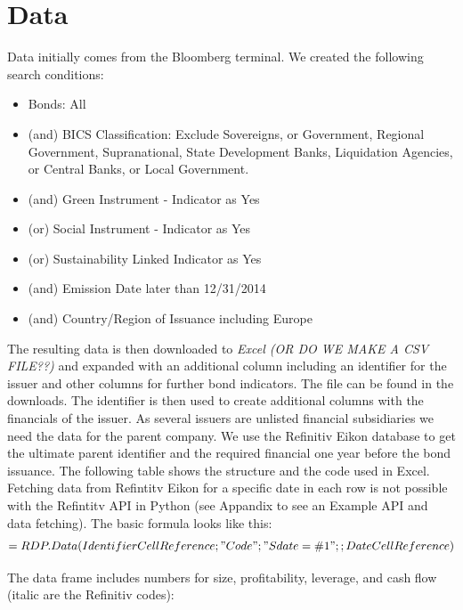 \documentclass[12pt, a4paper]{article}
\begin{document}
\section{Data}
Data initially comes from the Bloomberg terminal. We created the following search conditions:
\begin{itemize}
    \item Bonds: All
    \item (and) BICS Classification: Exclude Sovereigns, or Government, Regional Government, Supranational, State Development Banks, Liquidation Agencies, or Central Banks, or Local Government.
    \item (and) Green Instrument - Indicator as Yes
    \item (or) Social Instrument - Indicator as Yes
    \item (or) Sustainability Linked Indicator as Yes
    \item (and) Emission Date later than 12/31/2014
    \item (and) Country/Region of Issuance including Europe
\end{itemize}
The resulting data is then downloaded to \textit{Excel (OR DO WE MAKE A CSV FILE??)} and expanded with an additional column including an identifier for the issuer and other columns for further bond indicators. The file can be found in the downloads. The identifier is then used to create additional columns with the financials of the issuer. As several issuers are unlisted financial subsidiaries we need the data for the parent company. We use the Refinitiv Eikon database to get the ultimate parent identifier and the required financial one year before the bond issuance. The following table shows the structure and the code used in Excel. Fetching data from Refintitv Eikon for a specific date in each row is not possible with the Refintitv API in Python (see Appandix to see an Example API and data fetching). The basic formula looks like this: 
\begin{align}
    =RDP.Data(Identifier Cell Reference;"Code";"Sdate=\#1";;Date Cell Reference)
\end{align}

The data frame includes numbers for size, profitability, leverage, and cash flow (italic are the Refinitiv codes):
\end{document}
